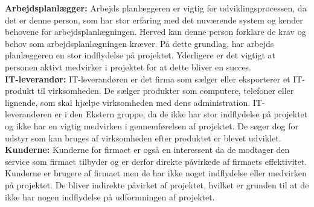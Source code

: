 \noindent\textbf{Arbejdsplanlægger:}
Arbejds planlæggeren er vigtig for udviklingsprocessen, da det er denne person, som har stor erfaring med det nuværende system og kender behovene for arbejdsplanlægningen. Herved kan denne person forklare de krav og behov som arbejdsplanlægningen kræver. På dette grundlag, har arbejds planlæggeren en stor indflydelse på projektet. Yderligere er det vigtigt at personen aktivt medvirker i projektet for at dette bliver en succes. \\


\noindent\textbf{IT-leverandør:}
IT-leverandøren er det firma som sælger eller eksporterer et IT-produkt til virksomheden. De sælger produkter som computere, telefoner eller lignende, som skal hjælpe virksomheden med dens administration.
IT-leverandøren er i den Ekstern gruppe, da de ikke har stor indflydelse på projektet og ikke har en vigtig medvirken i gennemførelsen af projektet. De søger dog for udstyr som kan bruges af virksomheden efter produktet er blevet udviklet.\\

\noindent\textbf{Kunderne:}
Kunderne for firmaet er også en interessent da de modtager den service som firmaet tilbyder og er derfor direkte påvirkede af firmaets effektivitet. Kunderne er brugere af firmaet men de har ikke noget indflydelse eller medvirken på projektet. De bliver indirekte påvirket af projektet, hvilket er grunden til at de ikke har nogen indflydelse på udformningen af projektet.
\\

